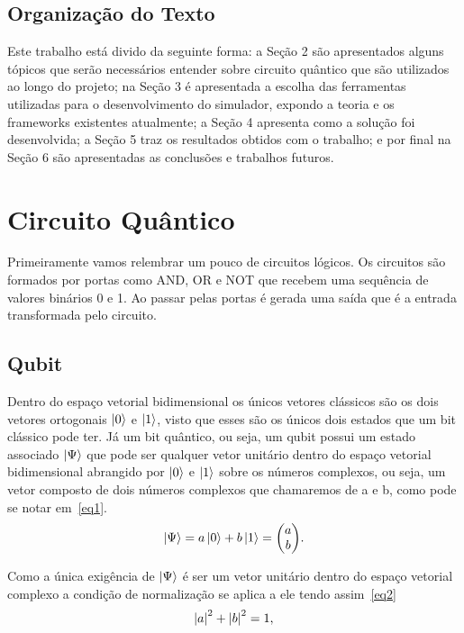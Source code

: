 \documentclass[a4paper, 12pt, oneside]{book}
\begin{document}
\section{Organização do Texto}

Este trabalho está divido da seguinte forma: a Seção 2 são apresentados alguns tópicos que serão necessários entender sobre circuito quântico que são utilizados ao longo do projeto; na Seção 3 é apresentada a escolha das ferramentas utilizadas para o desenvolvimento do simulador, expondo a teoria e os frameworks existentes atualmente; a Seção 4 apresenta como a solução foi desenvolvida; a Seção 5 traz os resultados obtidos com o trabalho; e por final na Seção 6 são apresentadas as conclusões e trabalhos futuros.


\chapter{Circuito Quântico}

Primeiramente vamos relembrar um pouco de circuitos lógicos. Os circuitos são formados por portas como AND, OR e NOT que recebem uma sequência de valores binários 0 e 1. Ao passar pelas portas é gerada uma saída que é a entrada transformada pelo circuito.

\section{Qubit}
Dentro do espaço vetorial bidimensional os únicos vetores clássicos são os dois vetores ortogonais $\ket{0}$ e $\ket{1}$, visto que esses são os únicos dois estados que um bit clássico pode ter. Já um bit quântico, ou seja, um qubit possui um estado associado $\ket{\Psi}$ que pode ser qualquer vetor unitário dentro do espaço vetorial bidimensional abrangido por $\ket{0}$ e $\ket{1}$ sobre os números complexos, ou seja, um vetor composto de dois números complexos que chamaremos de a e b, como pode se notar em~\eqref{eq1}.
\begin{equation} \label{eq1} 
\ket{\Psi} = a\ket{0} + b\ket{1} = \mqty(a\\b).
\end{equation}

Como a única exigência de $\ket{\Psi}$ é ser um vetor unitário dentro do espaço vetorial complexo a condição de normalização se aplica a ele tendo assim~\eqref{eq2}
\begin{equation}\label{eq2}
\abs{a}^2 + \abs{b}^2 = 1,
\end{equation}
\end{document}
